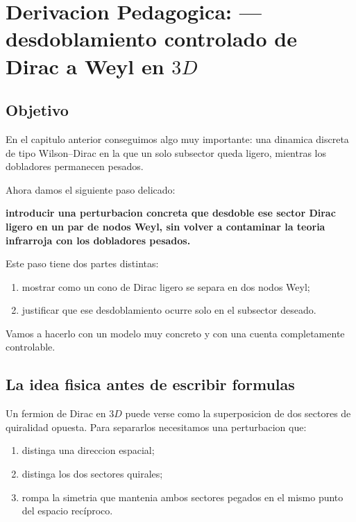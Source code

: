 \chapter{Derivacion Pedagogica: --- desdoblamiento controlado de Dirac a Weyl en \(3D\)}
\label{ch:desdoblamiento-dirac-a-weyl-3d}







\section{Objetivo}
En el capitulo anterior conseguimos algo muy importante: una dinamica discreta de tipo Wilson--Dirac en la que un solo subsector queda ligero, mientras los dobladores permanecen pesados.

Ahora damos el siguiente paso delicado:
\begin{displayquote}
\textbf{introducir una perturbacion concreta que desdoble ese sector Dirac ligero en un par de nodos Weyl, sin volver a contaminar la teoria infrarroja con los dobladores pesados.}
\end{displayquote}

Este paso tiene dos partes distintas:
\begin{enumerate}[label=\arabic*.]
    \item mostrar como un cono de Dirac ligero se separa en dos nodos Weyl;
    \item justificar que ese desdoblamiento ocurre solo en el subsector deseado.
\end{enumerate}

Vamos a hacerlo con un modelo muy concreto y con una cuenta completamente controlable.

\section{La idea fisica antes de escribir formulas}
Un fermion de Dirac en \(3D\) puede verse como la superposicion de dos sectores de quiralidad opuesta. Para separarlos necesitamos una perturbacion que:
\begin{enumerate}[label=\arabic*.]
    \item distinga una direccion espacial;
    \item distinga los dos sectores quirales;
    \item rompa la simetria que mantenia ambos sectores pegados en el mismo punto del espacio recíproco.
\end{enumerate}

